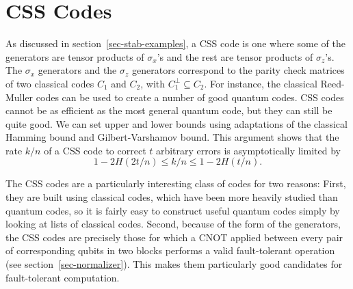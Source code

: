 \documentclass{report}
\newcommand{\X}{\sigma_x}
\newcommand{\Z}{\sigma_z}
\begin{document}
\section{CSS Codes}
\label{sec-CSS}

As discussed in section~\ref{sec-stab-examples}, a CSS code 
\cite{calderbank-CSS,steane-CSS} is one where
some of the generators are tensor products of $\X$'s and the rest are tensor
products of $\Z$'s.  The $\X$ generators and the $\Z$ generators correspond 
to the parity check matrices of two classical codes $C_1$ and $C_2$, with
$C_1^{\perp} \subseteq C_2$.  For instance, the classical Reed-Muller codes
can be used to create a number of good quantum codes.  CSS codes cannot be
as efficient as the most general quantum code, but they can still be quite
good.  We can set upper and lower bounds using adaptations of the classical
Hamming bound and Gilbert-Varshamov bound.  This argument shows that the
rate $k/n$ of a CSS code to correct $t$ arbitrary errors is asymptotically 
limited by 
\begin{equation}
1 - 2 H(2t/n) \leq k/n \leq 1 - 2 H(t/n).
\end{equation} 

The CSS codes are a particularly interesting class of codes for two reasons: 
First, they are built using classical codes, which have been more heavily
studied than quantum codes, so it is fairly easy to construct useful quantum
codes simply by looking at lists of classical codes.  Second, because of
the form of the generators, the CSS codes are precisely those for which a
CNOT applied between every pair of corresponding qubits in two blocks performs
a valid fault-tolerant operation (see section~\ref{sec-normalizer}).  This
makes them particularly good candidates for fault-tolerant computation.
\end{document}
